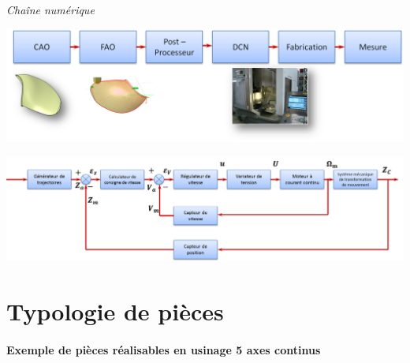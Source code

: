 \documentclass[11pt,oneside]{article}
\begin{document}
\begin{center}
\textit{Chaîne numérique}

\includegraphics[width=.95\textwidth]{png/chaine_num}
\end{center}


\begin{center}
\includegraphics[width=.95\textwidth]{png/asservissement_cn}
\end{center}

\section{Typologie de pièces}
\paragraph*{Exemple de pièces réalisables en usinage 5 axes continus \cite{roeders}}
\end{document}

